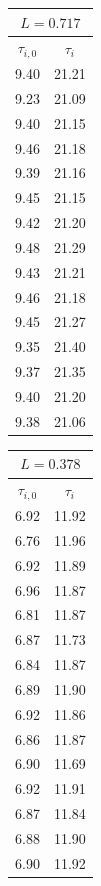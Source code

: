 \documentclass[a4paper]{article}
\begin{document}
\begin{table} [!ht]
    \centering
    \begin{tabular}{|c|c|}
    \hline
    \multicolumn{2}{|c|}{$L = 0.717$} \\
    \hline
    $\tau_{i,0}$ & $\tau_i$ \\
    \hline
    9.40 & 21.21 \\
    9.23 & 21.09 \\
    9.40 & 21.15 \\
    9.46 & 21.18 \\
    9.39 & 21.16 \\
    9.45 & 21.15 \\
    9.42 & 21.20 \\
    9.48 & 21.29 \\
    9.43 & 21.21 \\
    9.46 & 21.18 \\
    9.45 & 21.27 \\
    9.35 & 21.40 \\
    9.37 & 21.35 \\
    9.40 & 21.20 \\
    9.38 & 21.06 \\
    \hline
    \end{tabular}
    \quad
    \begin{tabular}{|c|c|}
    \hline
    \multicolumn{2}{|c|}{$L = 0.378$} \\
    \hline
    $\tau_{i,0}$ & $\tau_i$ \\
    \hline
    6.92 & 11.92 \\
    6.76 & 11.96 \\
    6.92 & 11.89 \\
    6.96 & 11.87 \\
    6.81 & 11.87 \\
    6.87 & 11.73 \\
    6.84 & 11.87 \\
    6.89 & 11.90 \\
    6.92 & 11.86 \\
    6.86 & 11.87 \\
    6.90 & 11.69 \\
    6.92 & 11.91 \\
    6.87 & 11.84 \\
    6.88 & 11.90 \\
    6.90 & 11.92 \\
    \hline
    \end{tabular}    
\end{table}
\FloatBarrier
\end{document}
